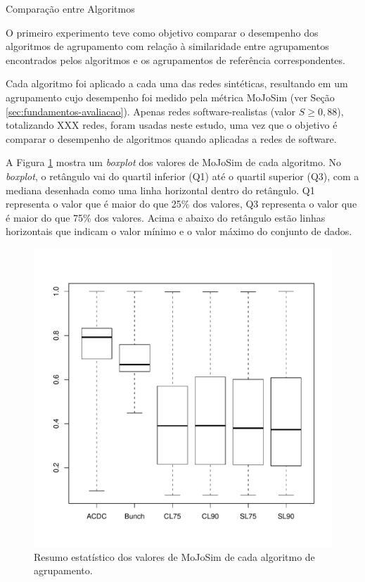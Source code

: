 \begin{section}{Comparação entre Algoritmos}

O primeiro experimento teve como objetivo comparar o desempenho dos algoritmos de agrupamento com relação à similaridade entre agrupamentos encontrados pelos algoritmos e os agrupamentos de referência correspondentes.

Cada algoritmo foi aplicado a cada uma das redes sintéticas, resultando em um agrupamento cujo desempenho foi medido pela métrica MoJoSim (ver Seção \ref{sec:fundamentos-avaliacao}). Apenas redes software-realistas (valor $S \ge 0,88$), totalizando XXX redes, foram usadas neste estudo, uma vez que o objetivo é comparar o desempenho de algoritmos quando aplicadas a redes de software.

A Figura \ref{fig:box-mojo-por-alg} mostra um \emph{boxplot} dos valores de MoJoSim de cada algoritmo. No \emph{boxplot}, o retângulo vai do quartil inferior (Q1) até o quartil superior (Q3), com a mediana desenhada como uma linha horizontal dentro do retângulo. Q1 representa o valor que é maior do que 25\% dos valores, Q3 representa o valor que é maior do que 75\% dos valores. Acima e abaixo do retângulo estão linhas horizontais que indicam o valor mínimo e o valor máximo do conjunto de dados. %

\begin{figure}[htbp]
	\centering
		\includegraphics[scale=0.5]{figuras/box-mojo-por-alg}
	\caption{Resumo estatístico dos valores de MoJoSim de cada algoritmo de agrupamento.}
	\label{fig:box-mojo-por-alg}
\end{figure}



\end{section}
